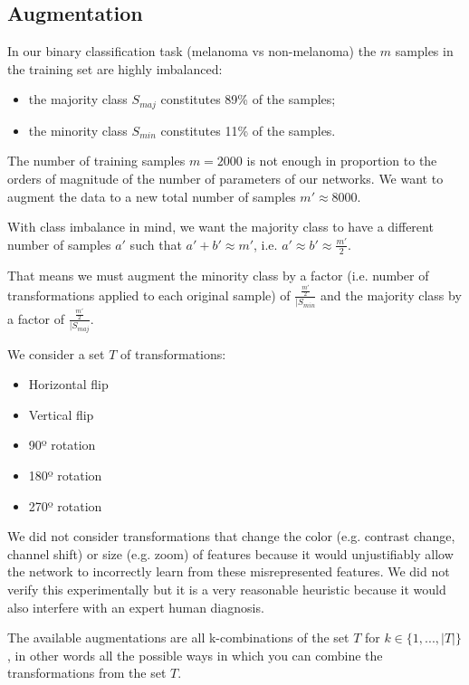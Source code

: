 \subsection{Augmentation}
\label{subsection:augmentation}

In our binary classification task (melanoma vs non-melanoma) the $m$ samples in the training set are highly imbalanced:

\begin{itemize}
    \item the majority class $S_{maj}$ constitutes 89\% of the samples;
    \item the minority class $S_{min}$ constitutes 11\% of the samples.
\end{itemize}

The number of training samples $m = 2000$ is not enough in proportion to the orders of magnitude of the number of parameters of our networks. We want to augment the data to a new total number of samples $m' \approx 8000$.

With class imbalance in mind, we want the majority class to have a different number of samples $a'$ such that $a' + b' \approx m'$, i.e. $a' \approx b' \approx \frac{m'}{2}$.

That means we must augment the minority class by a factor (i.e. number of transformations applied to each original sample) of $\frac{\frac{m'}{2}}{|S_{min}}$ and the majority class by a factor of $\frac{\frac{m'}{2}}{|S_{maj}}$.

We consider a set $T$ of transformations:

\begin{itemize}
    \item Horizontal flip
    \item Vertical flip
    \item 90º rotation
    \item 180º rotation
    \item 270º rotation
\end{itemize}

We did not consider transformations that change the color (e.g. contrast change, channel shift) or size (e.g. zoom) of features because it would unjustifiably allow the network to incorrectly learn from these misrepresented features. We did not verify this experimentally but it is a very reasonable heuristic because it would also interfere with an expert human diagnosis.

The available augmentations are all k-combinations of the set $T$ for $k \in \{1, ..., |T|\}$, in other words all the possible ways in which you can combine the transformations from the set $T$.

